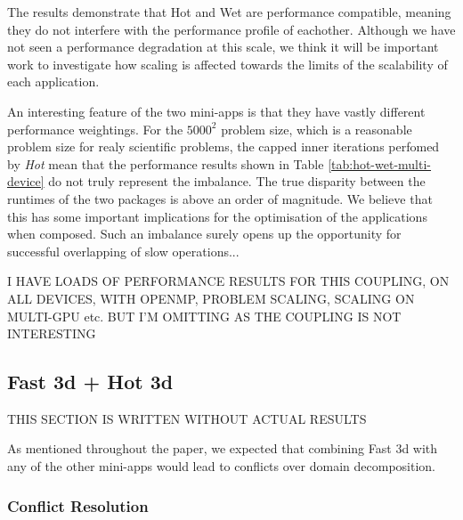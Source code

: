 \documentclass[runningheads,a4paper]{llncs}
\begin{document}
%


The results demonstrate that Hot and Wet are performance compatible, meaning they do not interfere with the performance profile of eachother. Although we have not seen a performance degradation at this scale, we think it will be important work to investigate how scaling is affected towards the limits of the scalability of each application.

An interesting feature of the two mini-apps is that they have vastly different performance weightings. For the $5000^2$ problem size, which is a reasonable problem size for realy scientific problems, the capped inner iterations perfomed by \textit{Hot} mean that the performance results shown in Table \ref{tab:hot-wet-multi-device} do not truly represent the imbalance. The true disparity between the runtimes of the two packages is above an order of magnitude. We believe that this has some important implications for the optimisation of the applications when composed. Such an imbalance surely opens up the opportunity for successful overlapping of slow operations...

I HAVE LOADS OF PERFORMANCE RESULTS FOR THIS COUPLING, ON ALL DEVICES, WITH OPENMP, PROBLEM SCALING, SCALING ON MULTI-GPU etc. BUT I'M OMITTING AS THE COUPLING IS NOT INTERESTING

\subsection{Fast 3d + Hot 3d}

THIS SECTION IS WRITTEN WITHOUT ACTUAL RESULTS

As mentioned throughout the paper, we expected that combining Fast 3d with any of the other mini-apps would lead to conflicts over domain decomposition. 

\subsubsection{Conflict Resolution}
\end{document}
